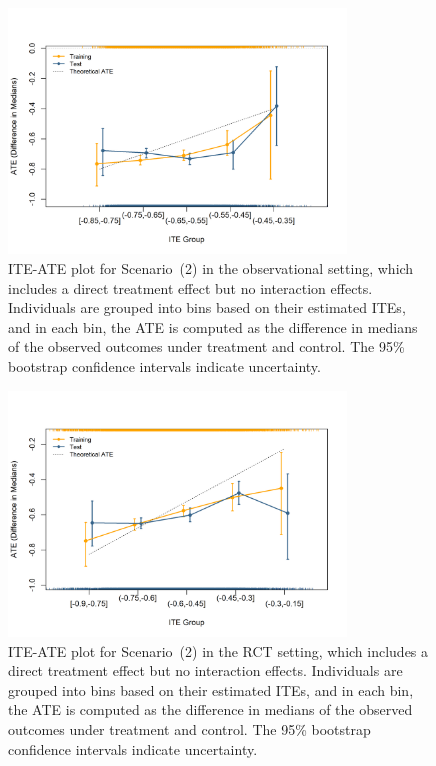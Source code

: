 \begin{figure}[htbp]
\centering
\includegraphics[width=0.8\textwidth]{img/results/observ_scenario2_ITE_ATE.png}
\vspace{-15pt}
\caption{ITE-ATE plot for Scenario~(2) in the observational setting, which includes a direct treatment effect but no interaction effects. Individuals are grouped into bins based on their estimated ITEs, and in each bin, the ATE is computed as the difference in medians of the observed outcomes under treatment and control. The 95\% bootstrap confidence intervals indicate uncertainty.}
\label{fig:observ_scenario2_ite_ATE}
\end{figure}



\begin{figure}[htbp]
\centering
\includegraphics[width=0.8\textwidth]{img/results/rct_scenario2_ITE_ATE.png}
\vspace{-15pt}
\caption{ITE-ATE plot for Scenario~(2) in the RCT setting, which includes a direct treatment effect but no interaction effects. Individuals are grouped into bins based on their estimated ITEs, and in each bin, the ATE is computed as the difference in medians of the observed outcomes under treatment and control. The 95\% bootstrap confidence intervals indicate uncertainty.}
\label{fig:rct_scenario2_ite_ATE}
\end{figure}



